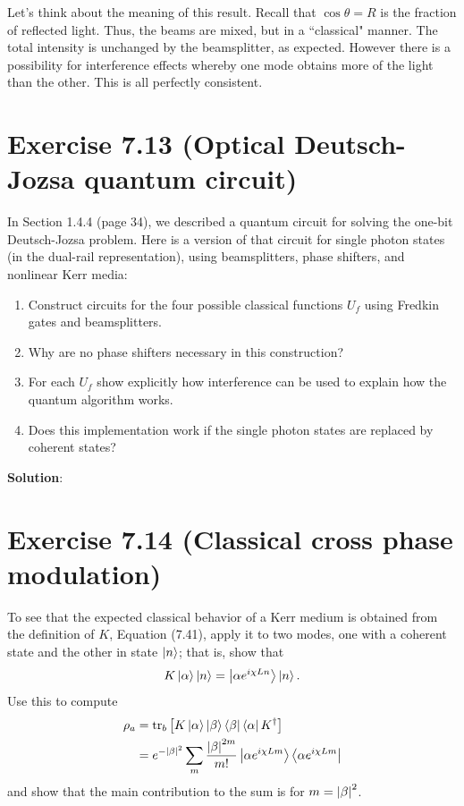 \documentclass{book}
\begin{document}
    Let's think about the meaning of this result. Recall that $\cos\theta = R$ is the fraction of reflected light. Thus, the beams are mixed, but in a ``classical" manner. The total intensity is unchanged by the beamsplitter, as expected. However there is a possibility for interference effects whereby one mode obtains more of the light than the other. This is all perfectly consistent. 

\section*{Exercise 7.13 (Optical Deutsch-Jozsa quantum circuit)}
    In Section 1.4.4 (page 34), we described a quantum circuit for solving the one-bit Deutsch-Jozsa problem. Here is a version of that circuit for single photon states (in the dual-rail representation), using beamsplitters, phase shifters, and nonlinear Kerr media:

    \begin{enumerate}
        \item Construct circuits for the four possible classical functions $U_f$ using Fredkin gates and beamsplitters.
        \item Why are no phase shifters necessary in this construction?
        \item For each $U_f$ show explicitly how interference can be used to explain how the quantum algorithm works.
        \item Does this implementation work if the single photon states are replaced by coherent states?
    \end{enumerate}

    \textbf{Solution}:

\section*{Exercise 7.14 (Classical cross phase modulation)}
    To see that the expected classical behavior of a Kerr medium is obtained from the definition of $K$, Equation (7.41), apply it to two modes, one with a coherent state and the other in state $\ket{n}$; that is, show that
    \begin{align}
        K\ket{\alpha}\ket{n} = \ket{\alpha e^{i\chi L n}} \ket{n}.
    \end{align}
    Use this to compute
    \begin{align}
        \rho_a &= \tr_b \left[K\ket{\alpha}\ket{\beta}\bra{\beta}\bra{\alpha}K^\dagger\right] \\
        &= e^{-\abs{\beta}^2} \sum_{m} \frac{\abs{\beta}^{2m}}{m!} \ket{\alpha e^{i\chi Lm}}\bra{\alpha e^{i\chi Lm}}
    \end{align}
    and show that the main contribution to the sum is for $m = \abs{\beta}^2$.
\end{document}
